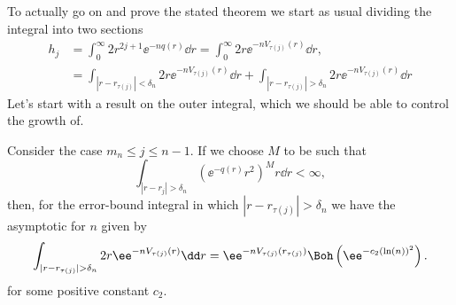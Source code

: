 To actually go on and prove the stated theorem we start as usual dividing the integral into two sections
\begin{align}
	h_j & = \int_{0}^{\infty} 2 r^{2j + 1} \ee^{-n q(r)} \dd r = \int_{0}^{\infty} 2 r \ee^{-n V_{\tau(j)} (r)} \dd r, \\
	&=\int_{|r - r_{\tau(j)}| < \delta_n} 2 r \ee^{-n V_{\tau(j)}(r)} \dd r+ \int_{|r - r_{\tau(j)}| > \delta_n} 2 r \ee^{-nV_{\tau(j)}(r)} \dd r
	\label{Equation: Separation disk}
\end{align}
 Let's start with a result on the outer integral, which we should be able to control the growth of. 

\begin{lema}  \label{Lemma: mn - N error contributing}
	Consider the case $m_n \leq j \leq n-1$.  If we choose $M$ to be such that
	\begin{equation}
		\int_{|r - r_j| > \delta_n} \left( \ee^{-q(r)} r^{2} \right)^M r \dd r < \infty,
	\end{equation}
	then, for the error-bound integral in which $|r - r_{\tau(j)}| > \delta_n$ we have the asymptotic for $n$ given by
	\begin{equation}
	\int_{|r - r_{\tau(j)}| > \delta_n} 2 r \ee^{-nV_{\tau(j)}(r)} \dd r = \ee^{-n V_{\tau(j)}(r_{\tau(j)})} \Boh\left(\ee^{-c_2 (\ln(n))^2}\right).
	\end{equation}
	for some positive constant $c_2$.
\end{lema}
